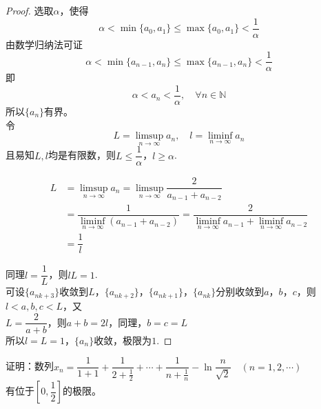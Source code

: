 \begin{proof}

    选取$\alpha$，使得
    $$\alpha < \min\{a_0, a_1\} \leq \max\{a_0, a_1\} < \dfrac{1}{\alpha}$$
    由数学归纳法可证
    $$\alpha < \min\{a_{n - 1}, a_n\} \leq \max\{a_{n - 1}, a_n\} < \dfrac{1}{\alpha}$$
    即
    $$\alpha < a_n < \dfrac{1}{\alpha}, \quad \forall n \in \mathbb{N}$$
    所以$\{a_n\}$有界。\\
    令
    $$L = \limsup_{n \to \infty}{a_n}, \quad l = \liminf_{n \to \infty}{a_n}$$
    且易知$L, l$均是有限数，则$L \leq \dfrac{1}{\alpha}$，$l \geq \alpha$.

    \begin{align*}
        L & = \limsup_{n \to \infty}{a_n} = \limsup_{n \to \infty}{\dfrac{2}{a_{n - 1} + a_{n - 2}}} \\
         & = \dfrac{1}{\liminf\limits_{n \to \infty}{(a_{n - 1} + a_{n - 2})}} = \dfrac{2}{\liminf\limits_{n \to \infty}{a_{n - 1}} + \liminf\limits_{n \to \infty}{a_{n - 2}}} \\ 
         & = \dfrac{1}{l}
    \end{align*}

    同理$l = \dfrac{1}{L}$，则$lL = 1$. \\
    可设$\{a_{nk + 3}\}$收敛到$L$，$\{a_{nk + 2}\}$，$\{a_{nk + 1}\}$，$\{a_{nk}\}$分别收敛到$a$，$b$，$c$，则$l < a, b, c < L$，又 \\
    $L = \dfrac{2}{a + b} $，则$a + b = 2l $，同理，$b = c = L$ \\
    所以$l = L = 1$，$\{a_n\}$收敛，极限为$1$.

\end{proof}

\begin{proposition}

    证明：数列$x_n = \dfrac{1}{1 + 1} + \dfrac{1}{2 + \frac{1}{2}} + \cdots + \dfrac{1}{n + \frac{1}{n}} - \ln{\dfrac{n}{\sqrt{2}}} \quad (n = 1, 2, \cdots)$ \\
    有位于$\left[ 0, \dfrac{1}{2} \right]$的极限。
    
\end{proposition}

